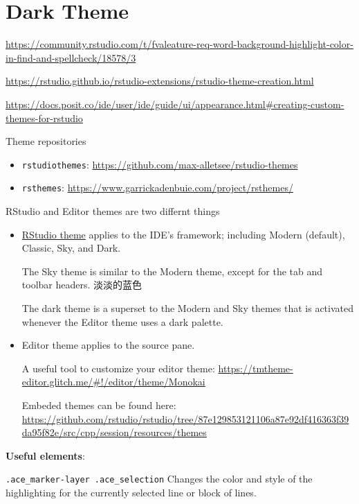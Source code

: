 \documentclass[
  a4paper,
  twoside,
  openright]{book}
\providecommand{\tightlist}{%
  \setlength{\itemsep}{0pt}\setlength{\parskip}{0pt}}
\theoremstyle{definition}
\theoremstyle{definition}
\theoremstyle{definition}
\theoremstyle{definition}
\theoremstyle{remark}
\begin{document}
\section{Dark Theme}\label{dark-theme}

\url{https://community.rstudio.com/t/fvaleature-req-word-background-highlight-color-in-find-and-spellcheck/18578/3}

\url{https://rstudio.github.io/rstudio-extensions/rstudio-theme-creation.html}

\url{https://docs.posit.co/ide/user/ide/guide/ui/appearance.html\#creating-custom-themes-for-rstudio}

Theme repositories

\begin{itemize}
\tightlist
\item
  \texttt{rstudiothemes}: \url{https://github.com/max-alletsee/rstudio-themes}
\item
  \texttt{rsthemes}: \url{https://www.garrickadenbuie.com/project/rsthemes/}
\end{itemize}

RStudio and Editor themes are two differnt things

\begin{itemize}
\item
  \href{https://support.posit.co/hc/en-us/articles/115011846747-Using-Themes-in-the-RStudio-IDE}{RStudio theme} applies to the IDE's framework; including Modern (default), Classic, Sky, and Dark.

  The Sky theme is similar to the Modern theme, except for the tab and toolbar headers. 淡淡的蓝色

  The dark theme is a superset to the Modern and Sky themes that is activated whenever the Editor theme uses a dark palette.
\item
  Editor theme applies to the source pane.

  A useful tool to customize your editor theme: \url{https://tmtheme-editor.glitch.me/\#!/editor/theme/Monokai}

  Embeded themes can be found here: \url{https://github.com/rstudio/rstudio/tree/87e129853121106a87e92df416363f39da95f82e/src/cpp/session/resources/themes}
\end{itemize}

\textbf{Useful elements}:

\texttt{.ace\_marker-layer\ .ace\_selection} Changes the color and style of the highlighting for the currently selected line or block of lines.
\end{document}
